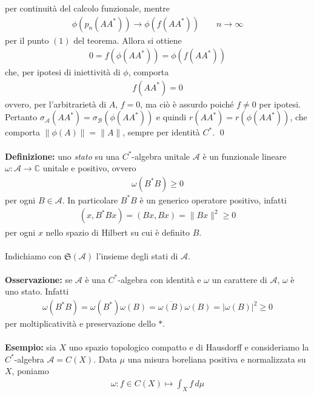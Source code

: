 \documentclass{article}
\numberwithin{equation}{subsection}
\begin{document}
per continuità del calcolo funzionale, mentre 
\begin{align*}
    \phi(p_n(AA^*)) \rightarrow \phi(f(AA^*)) \qquad n \rightarrow \infty
\end{align*}
per il punto $(1)$ del teorema. Allora si ottiene
\begin{align*}
    0 = f(\phi(AA^*)) = \phi(f(AA^*))
\end{align*}
che, per ipotesi di iniettività di $\phi$, comporta
\begin{align*}
    f(AA^*) = 0
\end{align*}
ovvero, per l'arbitrarietà di $A$, $f = 0$, ma ciò è assurdo poiché $f \neq 0$ per ipotesi. Pertanto $\sigma_\mathscr{A}(AA^*) = \sigma_\mathscr{B}(\phi(AA^*))$ e quindi $r(AA^*) = r(\phi(AA^*))$, che comporta $\|\phi(A)\| = \|A\|$, sempre per identità $C^*$. \qed \\ \\
\textbf{Definizione:} uno \textit{stato} su una $C^*$-algebra unitale $\mathscr{A}$ è un funzionale lineare $\omega : \mathscr{A} \longrightarrow \mathbb{C}$ unitale e positivo, ovvero 
\begin{align*}
    \omega(B^*B) \geq 0
\end{align*}
per ogni $B \in \mathscr{A}$. In particolare $B^*B$ è un generico operatore positivo, infatti
\begin{align*}
    (x, B^*Bx) = (Bx, Bx) = \|Bx\|^2 \geq 0 
\end{align*}
per ogni $x$ nello spazio di Hilbert su cui è definito $B$. \\ \\
Indichiamo con $\mathfrak{S}(\mathscr{A})$ l'insieme degli stati di $\mathscr{A}$. \\ \\
\textbf{Osservazione:} se $\mathscr{A}$ è una $C^*$-algebra con identità e $\omega$ un carattere di $\mathscr{A}$, $\omega$ è uno stato. Infatti
\begin{align*}
    \omega(B^*B) = \omega(B^*)\omega(B) = \overline{\omega(B)}\omega(B) = |\omega(B)|^2 \geq 0
\end{align*}
per moltiplicatività e preservazione dello $*$. \\ \\
\textbf{Esempio:} sia $X$ uno spazio topologico compatto e di Hausdorff e consideriamo la $C^*$-algebra $\mathscr{A} = C(X)$. Data $\mu$ una misura boreliana positiva e normalizzata su $X$, poniamo
\begin{align*}
    \omega : f \in C(X) \mapsto \int_X f \, d\mu
\end{align*}
\end{document}
